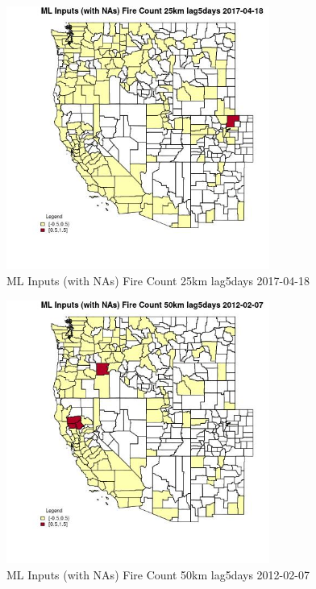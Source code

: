\begin{figure} 
\centering  
\includegraphics[width=0.77\textwidth]{Code_Outputs/Report_ML_input_PM25_Step4_part_f_de_duplicated_aveswNAs_CountyFire_Count_25km_lag5daysMean2017-04-18.jpg} 
\caption{\label{fig:Report_ML_input_PM25_Step4_part_f_de_duplicated_aveswNAsCountyFire_Count_25km_lag5daysMean2017-04-18}ML Inputs (with NAs) Fire Count 25km lag5days 2017-04-18} 
\end{figure} 
 

\begin{figure} 
\centering  
\includegraphics[width=0.77\textwidth]{Code_Outputs/Report_ML_input_PM25_Step4_part_f_de_duplicated_aveswNAs_CountyFire_Count_50km_lag5daysMean2012-02-07.jpg} 
\caption{\label{fig:Report_ML_input_PM25_Step4_part_f_de_duplicated_aveswNAsCountyFire_Count_50km_lag5daysMean2012-02-07}ML Inputs (with NAs) Fire Count 50km lag5days 2012-02-07} 
\end{figure} 
 

